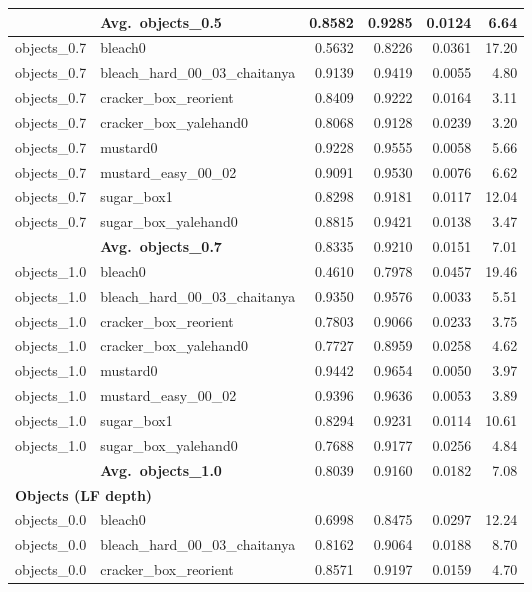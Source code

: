 \begin{longtable}{llrrrr}
  & \textbf{Avg.~objects_0.5} & 0.8582 & 0.9285 & 0.0124 & 6.64 \\
  \midrule
  objects_0.7 & bleach0 & 0.5632 & 0.8226 & 0.0361 & 17.20 \\
  objects_0.7 & bleach\_hard\_00\_03\_chaitanya & 0.9139 & 0.9419 & 0.0055 & 4.80 \\
  objects_0.7 & cracker\_box\_reorient & 0.8409 & 0.9222 & 0.0164 & 3.11 \\
  objects_0.7 & cracker\_box\_yalehand0 & 0.8068 & 0.9128 & 0.0239 & 3.20 \\
  objects_0.7 & mustard0 & 0.9228 & 0.9555 & 0.0058 & 5.66 \\
  objects_0.7 & mustard\_easy\_00\_02 & 0.9091 & 0.9530 & 0.0076 & 6.62 \\
  objects_0.7 & sugar\_box1 & 0.8298 & 0.9181 & 0.0117 & 12.04 \\
  objects_0.7 & sugar\_box\_yalehand0 & 0.8815 & 0.9421 & 0.0138 & 3.47 \\
  \cmidrule{2-6}
  & \textbf{Avg.~objects_0.7} & 0.8335 & 0.9210 & 0.0151 & 7.01 \\
  \midrule
  objects_1.0 & bleach0 & 0.4610 & 0.7978 & 0.0457 & 19.46 \\
  objects_1.0 & bleach\_hard\_00\_03\_chaitanya & 0.9350 & 0.9576 & 0.0033 & 5.51 \\
  objects_1.0 & cracker\_box\_reorient & 0.7803 & 0.9066 & 0.0233 & 3.75 \\
  objects_1.0 & cracker\_box\_yalehand0 & 0.7727 & 0.8959 & 0.0258 & 4.62 \\
  objects_1.0 & mustard0 & 0.9442 & 0.9654 & 0.0050 & 3.97 \\
  objects_1.0 & mustard\_easy\_00\_02 & 0.9396 & 0.9636 & 0.0053 & 3.89 \\
  objects_1.0 & sugar\_box1 & 0.8294 & 0.9231 & 0.0114 & 10.61 \\
  objects_1.0 & sugar\_box\_yalehand0 & 0.7688 & 0.9177 & 0.0256 & 4.84 \\
  \cmidrule{2-6}
  & \textbf{Avg.~objects_1.0} & 0.8039 & 0.9160 & 0.0182 & 7.08 \\
  \midrule
\multicolumn{6}{l}{\textbf{Objects (LF depth)}} \\
\midrule
  objects_0.0 & bleach0 & 0.6998 & 0.8475 & 0.0297 & 12.24 \\
  objects_0.0 & bleach\_hard\_00\_03\_chaitanya & 0.8162 & 0.9064 & 0.0188 & 8.70 \\
  objects_0.0 & cracker\_box\_reorient & 0.8571 & 0.9197 & 0.0159 & 4.70 \\

\end{longtable}
